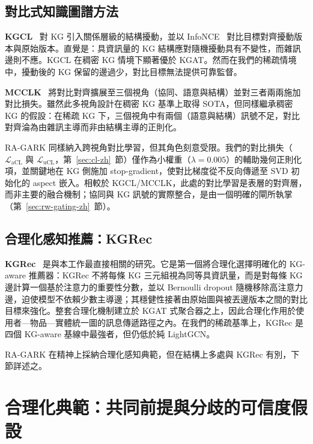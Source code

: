 \subsection{對比式知識圖譜方法}
\label{sec:rw-contrastive-zh}

\textbf{KGCL}~\cite{yang2022kgcl} 對 KG 引入關係層級的結構擾動，並以 InfoNCE~\cite{oord2018infonce} 對比目標對齊擾動版本與原始版本。直覺是：具資訊量的 KG 結構應對隨機擾動具有不變性，而雜訊邊則不應。KGCL 在稠密 KG 情境下顯著優於 KGAT。然而在我們的稀疏情境中，擾動後的 KG 保留的邊過少，對比目標無法提供可靠監督。

\textbf{MCCLK}~\cite{zou2022mcclk} 將對比對齊擴展至三個視角（協同、語意與結構）並對三者兩兩施加對比損失。雖然此多視角設計在稠密 KG 基準上取得 SOTA，但同樣繼承稠密 KG 的假設：在稀疏 KG 下，三個視角中有兩個（語意與結構）訊號不足，對比對齊淪為由雜訊主導而非由結構主導的正則化。

RA-GARK 同樣納入跨視角對比學習，但其角色刻意受限。我們的對比損失（$\mathcal{L}_{\mathrm{aCL}}$ 與 $\mathcal{L}_{\mathrm{uCL}}$，第~\ref{sec:cl-zh}~節）僅作為小權重（$\lambda = 0.005$）的輔助幾何正則化項，並關鍵地在 KG 側施加 stop-gradient，使對比梯度從不反向傳遞至 SVD 初始化的 aspect 嵌入。相較於 KGCL/MCCLK，此處的對比學習是表層的對齊層，而非主要的融合機制；協同與 KG 訊號的實際整合，是由一個明確的閘所執掌（第~\ref{sec:rw-gating-zh}~節）。

\subsection{合理化感知推薦：KGRec}
\label{sec:rw-kgrec-zh}

\textbf{KGRec}~\cite{yang2023kgrec} 是與本工作最直接相關的研究。它是第一個將合理化選擇明確化的 KG-aware 推薦器：KGRec 不將每條 KG 三元組視為同等具資訊量，而是對每條 KG 邊計算一個基於注意力的重要性分數，並以 Bernoulli dropout 隨機移除高注意力邊，迫使模型不依賴少數主導邊；其穩健性接著由原始圖與被丟邊版本之間的對比目標來強化。整套合理化機制建立於 KGAT 式聚合器之上，因此合理化作用於使用者—物品—實體統一圖的訊息傳遞路徑之內。在我們的稀疏基準上，KGRec 是四個 KG-aware 基線中最強者，但仍低於純 LightGCN。

RA-GARK 在精神上採納合理化感知典範，但在結構上多處與 KGRec 有別，下節詳述之。

\section{合理化典範：共同前提與分歧的可信度假設}
\label{sec:rw-paradigm-zh}

